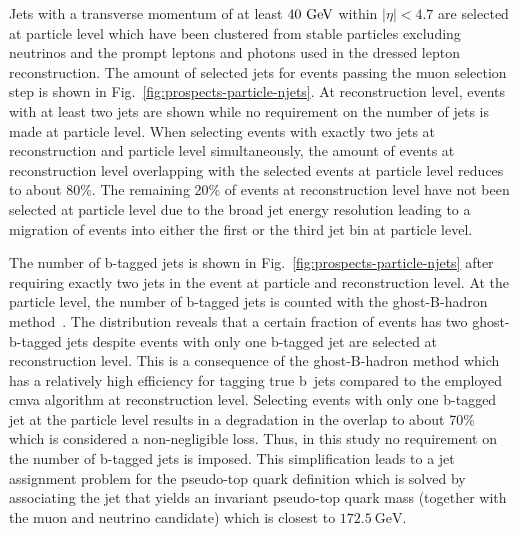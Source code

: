 Jets with a transverse momentum of at least $40~\textrm{GeV}$ within $|\eta|<4.7$ are selected at particle level which have been clustered from stable particles excluding neutrinos and the prompt leptons and photons used in the dressed lepton reconstruction. The amount of selected jets for events passing the muon selection step is shown in Fig.~\ref{fig:prospects-particle-njets}. At reconstruction level, events with at least two jets are shown while no requirement on the number of jets is made at particle level. When selecting events with exactly two jets at reconstruction and particle level simultaneously, the amount of events at reconstruction level overlapping with the selected events at particle level reduces to about 80\%. The remaining 20\% of events at reconstruction level have not been selected at particle level due to the broad jet energy resolution leading to a migration of events into either the first or the third jet bin at particle level.

The number of b-tagged jets is shown in Fig.~\ref{fig:prospects-particle-njets} after requiring exactly two jets in the event at particle and reconstruction level. 
At the particle level, the number of b-tagged jets is counted with the ghost-B-hadron method~\cite{Cacciari:2008gn}. The distribution reveals that a certain fraction of events has two ghost-b-tagged jets despite events with only one b-tagged jet are selected at reconstruction level. This is a consequence of the ghost-B-hadron method which has a relatively high efficiency for tagging true b~jets compared to the employed \gls{cmva} algorithm at reconstruction level. Selecting events with only one b-tagged jet at the particle level results in a degradation in the overlap to about 70\% which is considered a non-negligible loss. Thus, in this study no requirement on the number of b-tagged jets is imposed. This simplification leads to a jet assignment problem for the pseudo-top quark definition which is solved by associating the jet that yields an invariant pseudo-top quark mass (together with the muon and neutrino candidate) which is closest to $172.5~\mathrm{GeV}$.

